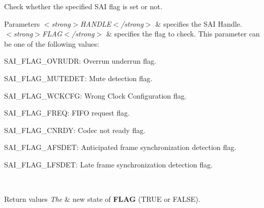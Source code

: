 Check whether the specified S\+AI flag is set or not. 


\begin{DoxyParams}{Parameters}
{\em $<$strong$>$\+H\+A\+N\+D\+L\+E$<$/strong$>$} & specifies the S\+AI Handle. \\
\hline
{\em $<$strong$>$\+F\+L\+A\+G$<$/strong$>$} & specifies the flag to check. This parameter can be one of the following values\+: \begin{DoxyItemize}
\item S\+A\+I\+\_\+\+F\+L\+A\+G\+\_\+\+O\+V\+R\+U\+DR\+: Overrun underrun flag. \item S\+A\+I\+\_\+\+F\+L\+A\+G\+\_\+\+M\+U\+T\+E\+D\+ET\+: Mute detection flag. \item S\+A\+I\+\_\+\+F\+L\+A\+G\+\_\+\+W\+C\+K\+C\+FG\+: Wrong Clock Configuration flag. \item S\+A\+I\+\_\+\+F\+L\+A\+G\+\_\+\+F\+R\+EQ\+: F\+I\+FO request flag. \item S\+A\+I\+\_\+\+F\+L\+A\+G\+\_\+\+C\+N\+R\+DY\+: Codec not ready flag. \item S\+A\+I\+\_\+\+F\+L\+A\+G\+\_\+\+A\+F\+S\+D\+ET\+: Anticipated frame synchronization detection flag. \item S\+A\+I\+\_\+\+F\+L\+A\+G\+\_\+\+L\+F\+S\+D\+ET\+: Late frame synchronization detection flag. \end{DoxyItemize}
\\
\hline
\end{DoxyParams}

\begin{DoxyRetVals}{Return values}
{\em The} & new state of {\bfseries F\+L\+AG} (T\+R\+UE or F\+A\+L\+SE). \\
\hline
\end{DoxyRetVals}

